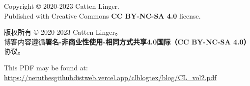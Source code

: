 \documentclass[11pt,a4paper]{report}
\date{2020-2023}
\newcommand{\volid}[0]{2}
\begin{document}
\begin{titlepage}
	\maketitle
\end{titlepage}

\tableofcontents
\clearpage












\cleardoublepage
\pagestyle{empty}
\hspace{1pt}
\vfill
{}\small

Copyright \copyright{} 2020-2023 Catten Linger.\\
Published with Creative Commons \textbf{CC BY-NC-SA 4.0} license.

版权所有 \copyright{} 2020-2023 Catten Linger。\\
博客内容遵循\textbf{署名-非商业性使用-相同方式共享4.0国际（CC BY-NC-SA 4.0）}协议。

This PDF may be found at:\\
\href{https://neruthesgithubdistweb.vercel.app/clblogtex/blog/CL\_vol\volid.pdf}{\ttfamily\footnotesize https://neruthesgithubdistweb.vercel.app/clblogtex/blog/CL\_vol\volid{}.pdf}
\end{document}
